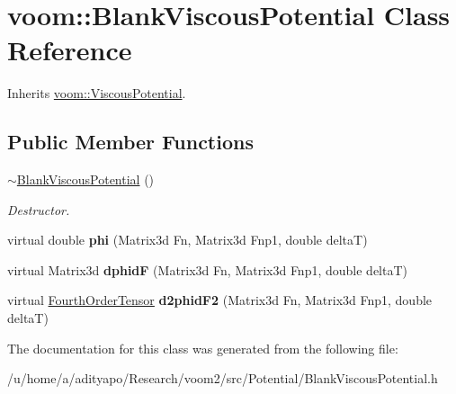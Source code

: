 \hypertarget{classvoom_1_1_blank_viscous_potential}{
\section{voom::BlankViscousPotential Class Reference}
\label{classvoom_1_1_blank_viscous_potential}
}


Inherits \hyperlink{classvoom_1_1_viscous_potential}{voom::ViscousPotential}.\subsection*{Public Member Functions}
\begin{DoxyCompactItemize}
\item 
\hypertarget{classvoom_1_1_blank_viscous_potential_a8898732d6e5c6e618ccb0047b7729f7d}{
\hyperlink{classvoom_1_1_blank_viscous_potential_a8898732d6e5c6e618ccb0047b7729f7d}{$\sim$BlankViscousPotential} ()}
\label{classvoom_1_1_blank_viscous_potential_a8898732d6e5c6e618ccb0047b7729f7d}

\begin{DoxyCompactList}\small\item\em Destructor. \item\end{DoxyCompactList}\item 
\hypertarget{classvoom_1_1_blank_viscous_potential_a9bca7b1accef7e70851ef7a12bc36dba}{
virtual double {\bfseries phi} (Matrix3d Fn, Matrix3d Fnp1, double deltaT)}
\label{classvoom_1_1_blank_viscous_potential_a9bca7b1accef7e70851ef7a12bc36dba}

\item 
\hypertarget{classvoom_1_1_blank_viscous_potential_a7c3fc6ef7592c64ca6b1822a07ecbe86}{
virtual Matrix3d {\bfseries dphidF} (Matrix3d Fn, Matrix3d Fnp1, double deltaT)}
\label{classvoom_1_1_blank_viscous_potential_a7c3fc6ef7592c64ca6b1822a07ecbe86}

\item 
\hypertarget{classvoom_1_1_blank_viscous_potential_af4979894429f641f6e98f73590c87768}{
virtual \hyperlink{classvoom_1_1_fourth_order_tensor}{FourthOrderTensor} {\bfseries d2phidF2} (Matrix3d Fn, Matrix3d Fnp1, double deltaT)}
\label{classvoom_1_1_blank_viscous_potential_af4979894429f641f6e98f73590c87768}

\end{DoxyCompactItemize}


The documentation for this class was generated from the following file:\begin{DoxyCompactItemize}
\item 
/u/home/a/adityapo/Research/voom2/src/Potential/BlankViscousPotential.h\end{DoxyCompactItemize}
